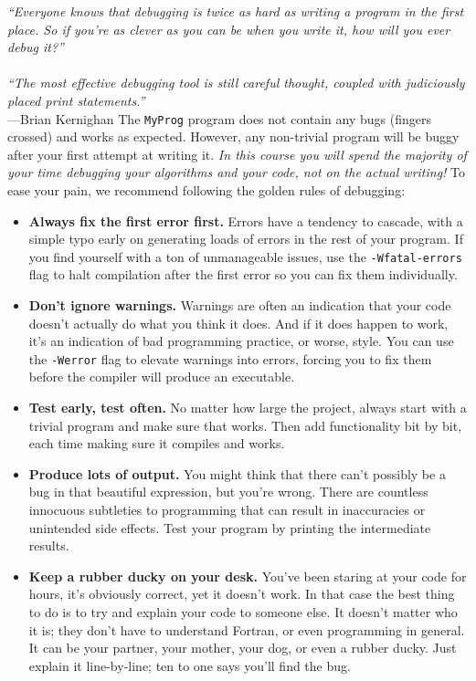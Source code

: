 \documentclass[openany,oneside]{report}
\renewenvironment{quote}{\list{}{\leftmargin=8\parindent}\item\relax}{\endlist}
\begin{document}
\begin{quote}\small
  \emph{``Everyone knows that debugging is twice as hard as writing a program in the first place.
  So if you're as clever as you can be when you write it, how will you ever debug it?'' \\ \\ 
  ``The most effective debugging tool is still careful thought, coupled with judiciously placed print statements.''} \\\hspace*{\fill}---Brian Kernighan
\end{quote}
The \texttt{MyProg} program does not contain any bugs (fingers crossed) and works as expected.
However, any non-trivial program will be buggy after your first attempt at writing it.
\emph{In this course you will spend the majority of your time debugging your algorithms and your code, not on the actual writing!} To ease your pain, we recommend following the golden rules of debugging:
\begin{itemize}
  \item\textbf{Always fix the first error first.} Errors have a tendency to cascade, with a simple typo early on generating loads of errors in the rest of your program.
    If you find yourself with a ton of unmanageable issues, use the \texttt{-Wfatal-errors} flag to halt compilation after the first error so you can fix them individually.
  \item\textbf{Don't ignore warnings.} Warnings are often an indication that your code doesn't actually do what you think it does.
    And if it does happen to work, it's an indication of bad programming practice, or worse, style.
    You can use the \texttt{-Werror} flag to elevate warnings into errors, forcing you to fix them before the compiler will produce an executable.
  \item\textbf{Test early, test often.} No matter how large the project, always start with a trivial program and make sure that works.
    Then add functionality bit by bit, each time making sure it compiles and works.
  \item\textbf{Produce lots of output.} You might think that there can't possibly be a bug in that beautiful expression, but you're wrong.
    There are countless innocuous subtleties to programming that can result in inaccuracies or unintended side effects.
    Test your program by printing the intermediate results.
  \item\textbf{Keep a rubber ducky on your desk.} You've been staring at your code for hours, it's obviously correct, yet it doesn't work.
    In that case the best thing to do is to try and explain your code to someone else.
    It doesn't matter who it is; they don't have to understand Fortran, or even programming in general.
    It can be your partner, your mother, your dog, or even a rubber ducky.
    Just explain it line-by-line; ten to one says you'll find the bug.
\end{itemize}
\end{document}
